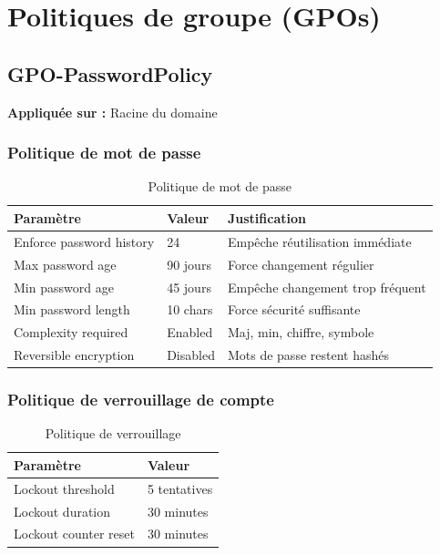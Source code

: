 \chapter{Politiques de groupe (GPOs)}

\section{GPO-PasswordPolicy}

\textbf{Appliquée sur :} Racine du domaine

\subsection{Politique de mot de passe}

\begin{table}[H]
    \centering
    \begin{tabularx}{\textwidth}{|p{3cm}|l|p{4cm}|}
        \hline
        \textbf{Paramètre} & \textbf{Valeur} & \textbf{Justification} \\
        \hline
        Enforce password history & 24 & Empêche réutilisation immédiate \\
        \hline
        Max password age & 90 jours & Force changement régulier \\
        \hline
        Min password age & 45 jours & Empêche changement trop fréquent \\
        \hline
        Min password length & 10 chars & Force sécurité suffisante \\
        \hline
        Complexity required & Enabled & Maj, min, chiffre, symbole \\
        \hline
        Reversible encryption & Disabled & Mots de passe restent hashés \\
        \hline
    \end{tabularx}
    \caption{Politique de mot de passe}
    \label{tab:pwd-policy}
\end{table}

\subsection{Politique de verrouillage de compte}

\begin{table}[H]
    \centering
    \begin{tabularx}{\textwidth}{|l|l|}
        \hline
        \textbf{Paramètre} & \textbf{Valeur} \\
        \hline
        Lockout threshold & 5 tentatives \\
        \hline
        Lockout duration & 30 minutes \\
        \hline
        Lockout counter reset & 30 minutes \\
        \hline
    \end{tabularx}
    \caption{Politique de verrouillage}
    \label{tab:lockout-policy}
\end{table}

